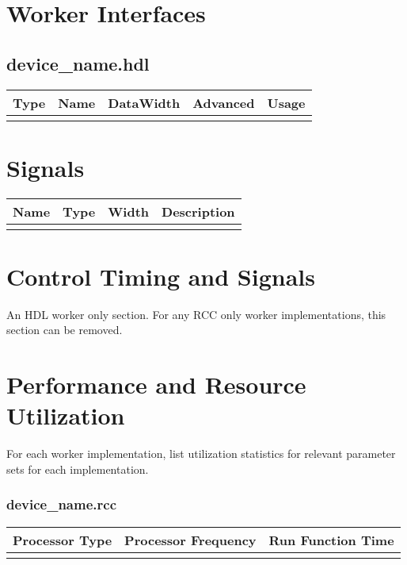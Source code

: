 \documentclass{article}
\def\comp{device\_name}
\begin{document}
\begin{landscape}
	\section*{Worker Interfaces}
	\subsection*{\comp.hdl}
	\begin{scriptsize}
		\begin{tabular}{|M{2cm}|M{1.5cm}|c|c|M{12cm}|}
			\hline
			Type & Name & DataWidth & Advanced & Usage \\
			\hline
			& & &\\
			\hline
		\end{tabular}
	\end{scriptsize}

	\section*{Signals}
	\begin{scriptsize}
		\begin{tabular}{|M{2.5cm}|M{1.5cm}|M{1.5cm}|M{14.5cm}|}
			\hline
			\rowcolor{blue}
			Name & Type & Width & Description \\
			\hline
			     &      &       &             \\
			\hline
		\end{tabular}
	\end{scriptsize}

\end{landscape}

\section*{Control Timing and Signals}
\begin{flushleft}
	An HDL worker only section. For any RCC only worker implementations, this section can be removed.
\end{flushleft}

\section*{Performance and Resource Utilization}
For each worker implementation, list utilization statistics for relevant parameter sets for each implementation.
\subsubsection*{\comp.rcc}
\begin{scriptsize}
	\begin{tabular}{|c|c|c|}
		\hline
		Processor Type & Processor Frequency & Run Function Time \\
		\hline
		               &                     &                   \\
		\hline
	\end{tabular}
\end{scriptsize}
\end{document}
